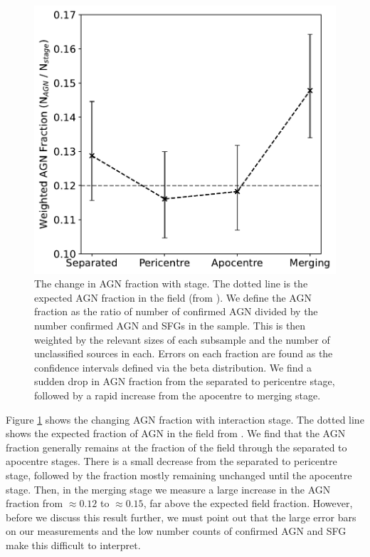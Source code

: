 \begin{figure}
\centering
\includegraphics[width=\textwidth]{Chapter3/figures/agn-frac-time.pdf}
\caption[The change in AGN fraction with stage.]{The change in AGN fraction with stage. The dotted line is the expected AGN fraction in the field (from \citet{2008AJ....135.1877E}). We define the AGN fraction as the ratio of number of confirmed AGN divided by the number confirmed AGN and SFGs in the sample. This is then weighted by the relevant sizes of each subsample and the number of unclassified sources in each. Errors on each fraction are found as the confidence intervals defined via the beta distribution. We find a sudden drop in AGN fraction from the separated to pericentre stage, followed by a rapid increase from the apocentre to merging stage.}
\label{fig:agn-frac-time}
\end{figure}

Figure \ref{fig:agn-frac-time} shows the changing AGN fraction with interaction stage. The dotted line shows the expected fraction of AGN in the field from \citet{2008AJ....135.1877E}. We find that the AGN fraction generally remains at the fraction of the field through the separated to apocentre stages. There is a small decrease from the separated to pericentre stage, followed by the fraction mostly remaining unchanged until the apocentre stage. Then, in the merging stage we measure a large increase in the AGN fraction from $\approx0.12$ to $\approx0.15$, far above the expected field fraction. However, before we discuss this result further, we must point out that the large error bars on our measurements and the low number counts of confirmed AGN and SFG make this difficult to interpret.

